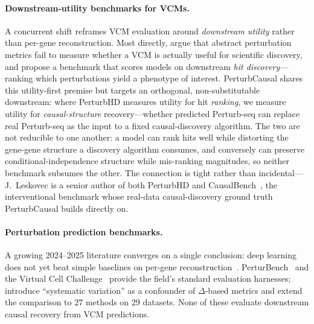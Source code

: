 \documentclass{article}
\theoremstyle{plain}
\theoremstyle{definition}
\theoremstyle{remark}
\begin{document}
\paragraph{Downstream-utility benchmarks for VCMs.} A concurrent shift reframes VCM evaluation around \emph{downstream utility} rather than per-gene reconstruction. Most directly, \citet{bereket2026perturbhd} argue that abstract perturbation metrics fail to measure whether a VCM is actually useful for scientific discovery, and propose a benchmark that scores models on downstream \emph{hit discovery}---ranking which perturbations yield a phenotype of interest. PerturbCausal shares this utility-first premise but targets an orthogonal, non-substitutable downstream: where PerturbHD measures utility for hit \emph{ranking}, we measure utility for \emph{causal-structure} recovery---whether predicted Perturb-seq can replace real Perturb-seq as the input to a fixed causal-discovery algorithm. The two are not reducible to one another: a model can rank hits well while distorting the gene-gene structure a discovery algorithm consumes, and conversely can preserve conditional-independence structure while mis-ranking magnitudes, so neither benchmark subsumes the other. The connection is tight rather than incidental---J.\ Leskovec is a senior author of both PerturbHD and CausalBench~\citep{chevalley2025causalbench}, the interventional benchmark whose real-data causal-discovery ground truth PerturbCausal builds directly on.

\paragraph{Perturbation prediction benchmarks.} A growing 2024--2025 literature converges on a single conclusion: deep learning does not yet beat simple baselines on per-gene reconstruction~\citep{ahlmanneltze2025,wong2025simple,csendes2025benchmark,wei2025benchmark,vinas2025systema,bendidi2024pca,wenteler2025perteval,zhu2025garm,li2025systematic,mejia2025diversity}. PerturBench~\citep{wu2024perturbench} and the Virtual Cell Challenge~\citep{roohani2025vcc} provide the field's standard evaluation harnesses; \citet{vinas2025systema} introduce ``systematic variation'' as a confounder of $\Delta$-based metrics and \citet{wei2025benchmark} extend the comparison to 27 methods on 29 datasets. None of these evaluate downstream causal recovery from VCM predictions.
\end{document}
